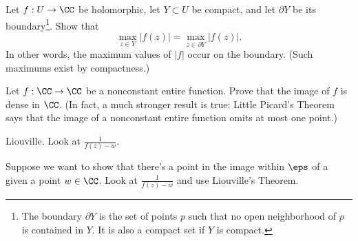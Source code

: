 
\begin{dproblem}
	Let $f : U \to \CC$ be holomorphic, let $Y \subset U$ be compact,
	and let $\partial Y$ be its boundary\footnote{
		The boundary $\partial Y$ is the set of points $p$
		such that no open neighborhood of $p$ is contained in $Y$.
		It is also a compact set if $Y$ is compact.
	}.
	Show that
	\[ \max_{z \in Y} \left\lvert f(z) \right\rvert
		= \max_{z \in \partial Y} \left\lvert f(z) \right\rvert. \]
	In other words, the maximum values of $\left\lvert f \right\rvert$ occur
	on the boundary. (Such maximums exist by compactness.)
\end{dproblem}

\begin{problem}
	Let $f : \CC \to \CC$ be a nonconstant entire function.
	Prove that the image of $f$ is dense in $\CC$.
	(In fact, a much stronger result is true:
	Little Picard's Theorem says that the image of a nonconstant
	entire function omits at most one point.)
	\begin{hint}
		Liouville. Look at $\frac{1}{f(z)-w}$.
	\end{hint}
	\begin{sol}
		Suppose we want to show that there's a point
		in the image within $\eps$ of a given a point $w \in \CC$.
		Look at $\frac{1}{f(z) - w}$ and use Liouville's Theorem.
	\end{sol}
\end{problem}

%

